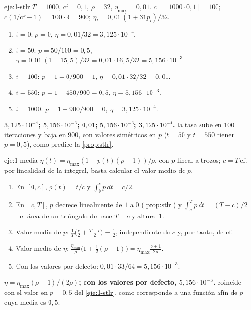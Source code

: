 \begin{solucion}{eje:1-stlr}
\datos $T=1000$, $\mathrm{cf}=0{,}1$, $\rho=32$, $\eta_{\max}=0{,}01$.
\planteamiento $c=\lfloor 1000\cdot 0{,}1\rfloor=100$; $c(1/\mathrm{cf}-1)=100\cdot 9=900$; $\eta_t=0{,}01\,(1+31p_t)/32$.
\pasos
\begin{enumerate}[label=\arabic*.]
  \item $t=0$: $p=0$, $\eta=0{,}01/32=3{,}125\cdot 10^{-4}$.
  \item $t=50$: $p=50/100=0{,}5$, $\eta=0{,}01\,(1+15{,}5)/32=0{,}01\cdot 16{,}5/32=5{,}156\cdot 10^{-3}$.
  \item $t=100$: $p=1-0/900=1$, $\eta=0{,}01\cdot 32/32=0{,}01$.
  \item $t=550$: $p=1-450/900=0{,}5$, $\eta=5{,}156\cdot 10^{-3}$.
  \item $t=1000$: $p=1-900/900=0$, $\eta=3{,}125\cdot 10^{-4}$.
\end{enumerate}
\resultado \textbf{$3{,}125\cdot 10^{-4}$; $5{,}156\cdot 10^{-3}$; $0{,}01$; $5{,}156\cdot 10^{-3}$; $3{,}125\cdot 10^{-4}$.}
\comprobacion la tasa sube en 100 iteraciones y baja en 900, con valores simétricos en $p$ ($t=50$ y $t=550$ tienen $p=0{,}5$), como predice la \cref{prop:stlr}.
\end{solucion}

\begin{solucion}{eje:1-media}
\datos $\eta(t)=\eta_{\max}(1+p(t)(\rho-1))/\rho$, con $p$ lineal a trozos; $c=T\,\mathrm{cf}$.
\planteamiento por linealidad de la integral, basta calcular el valor medio de $p$.
\pasos
\begin{enumerate}[label=\arabic*.]
  \item En $[0,c]$, $p(t)=t/c$ y $\int_0^{c}p\,dt=c/2$.
  \item En $[c,T]$, $p$ decrece linealmente de $1$ a $0$ (\cref{prop:stlr}) y $\int_c^{T}p\,dt=(T-c)/2$, el área de un triángulo de base $T-c$ y altura~1.
  \item Valor medio de $p$: $\frac1T\bigl(\frac c2+\frac{T-c}{2}\bigr)=\frac12$, independiente de $c$ y, por tanto, de $\mathrm{cf}$.
  \item Valor medio de $\eta$: $\frac{\eta_{\max}}{\rho}\bigl(1+\frac12(\rho-1)\bigr)=\eta_{\max}\frac{\rho+1}{2\rho}$.
  \item Con los valores por defecto: $0{,}01\cdot 33/64=5{,}156\cdot 10^{-3}$.
\end{enumerate}
\resultado \textbf{$\bar\eta=\eta_{\max}(\rho+1)/(2\rho)$; con los valores por defecto, $5{,}156\cdot 10^{-3}$.}
\comprobacion coincide con el valor en $p=0{,}5$ del \cref{eje:1-stlr}, como corresponde a una función afín de $p$ cuya media es $0{,}5$.
\end{solucion}

